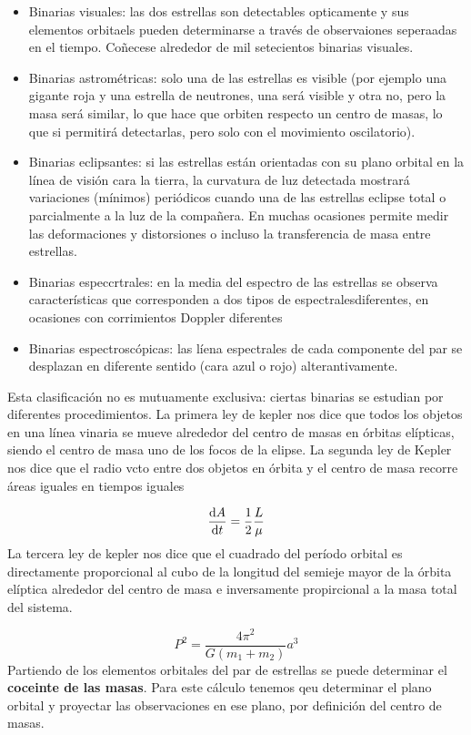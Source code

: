 \begin{itemize}
	\item Binarias visuales: las dos estrellas son detectables opticamente y sus elementos orbitaels pueden determinarse a través de observaiones seperaadas en el tiempo. Coñecese alrededor de mil setecientos binarias visuales.
	\item Binarias astrométricas: solo una de las estrellas es visible (por ejemplo una gigante roja y una estrella de neutrones, una será visible y otra no, pero la masa será similar, lo que hace que orbiten respecto un centro de masas, lo que si permitirá detectarlas, pero solo con el movimiento oscilatorio).
	\item Binarias eclipsantes: si las estrellas están orientadas con su plano orbital en la línea de visión cara la tierra, la curvatura de luz detectada mostrará variaciones (mínimos) periódicos cuando una de las estrellas eclipse total o parcialmente a la luz de la compañera. En muchas ocasiones permite medir las deformaciones y distorsiones o incluso la transferencia de masa entre estrellas.
	\item Binarias especcrtrales: en la media del espectro de las estrellas se observa características que corresponden a dos tipos de espectralesdiferentes, en ocasiones con corrimientos Doppler diferentes
	\item Binarias espectroscópicas: las líena espectrales de cada componente del par se desplazan en diferente sentido (cara azul o rojo) alterantivamente.
\end{itemize}
Esta clasificación no es mutuamente exclusiva: ciertas binarias se estudian por diferentes procedimientos. La primera ley de kepler nos dice que todos los objetos en una línea vinaria se mueve alrededor del centro de masas en órbitas elípticas, siendo el centro de masa uno de los focos de la elipse. La segunda ley de Kepler nos dice que el radio vcto entre dos objetos en órbita y el centro de masa recorre áreas iguales en tiempos iguales

\begin{equation*}
	\frac{\mathrm{d} A}{\mathrm{d} t} = \frac{1}{2} \frac{L}{\mu}
\end{equation*}
La tercera ley de kepler nos dice que el cuadrado del período orbital es directamente proporcional al cubo de la longitud del semieje mayor de la órbita elíptica alrededor del centro de masa e inversamente propircional a la masa total del sistema.

\begin{equation*}
	P^2 = \frac{4\pi^2}{G(m_1+m_2)} a^3
\end{equation*}
Partiendo de los elementos orbitales del par de estrellas se puede determinar el \textbf{coceinte de las masas}. Para este cálculo tenemos qeu determinar el plano orbital y proyectar las observaciones en ese plano, por definición del centro de masas.

